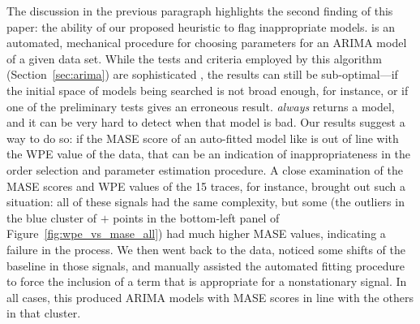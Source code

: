 The discussion in the previous paragraph highlights the second finding
of this paper: the ability of our proposed heuristic to flag
inappropriate models.  \arima is an automated, mechanical procedure
for choosing parameters for an ARIMA model of a given data set.  While
the tests and criteria employed by this algorithm
(Section~\ref{sec:arima}) are sophisticated , the results can still be
sub-optimal---if the initial space of models being searched is not
broad enough, for instance, or if one of the preliminary tests gives
an erroneous result.  \arima \emph{always} returns a model, and it can
be very hard to detect when that model is bad.  Our results suggest a
way to do so: if the MASE score of an auto-fitted model like \arima is
out of line with the WPE value of the data, that can be an indication
of inappropriateness in the order selection and parameter estimation
procedure.  A close examination of the \arima MASE scores and WPE
values of the 15 \col traces, for instance, brought out such a
situation: all of these signals had the same complexity, but some (the
outliers in the blue cluster of {\color{blue}$+$} points in the
bottom-left panel of Figure~\ref{fig:wpe_vs_mase_all}) had much higher
MASE values, indicating a failure in the \arima process.  We then went
back to the data, noticed some shifts of the baseline in those
signals, and manually assisted the automated fitting procedure to
force the inclusion of a term that is appropriate for a nonstationary
signal.  In all cases, this produced ARIMA models with MASE scores in
line with the others in that cluster.

